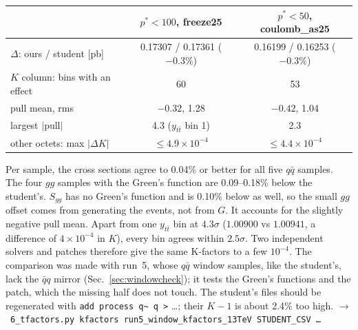 \documentclass[11pt]{article}
\newcommand{\code}[1]{\texttt{#1}}
\newcommand{\fn}[1]{\hfill$\to$~\code{#1}}
\begin{document}
\begin{center}\small
\begin{tabular}{@{}lcc@{}}
\toprule
 & $p^*<100$, freeze25 & $p^*<50$, coulomb\_as25\\
\midrule
$\Delta$: ours / student [pb] & 0.17307 / 0.17361 ($-0.3\%$) & 0.16199 / 0.16253 ($-0.3\%$)\\
$K$ column: bins with an effect & 60 & 53\\
\quad pull mean, rms & $-0.32$, 1.28 & $-0.42$, 1.04\\
\quad largest $|$pull$|$ & 4.3 ($y_{t\bar t}$ bin 1) & 2.3\\
other octets: max $|\Delta K|$ & $\le4.9\times10^{-4}$ & $\le4.4\times10^{-4}$\\
\bottomrule
\end{tabular}
\end{center}

Per sample, the cross sections agree to 0.04\% or better for all five $q\bar q$ samples. The four $gg$ samples with the Green's function
are 0.09--0.18\% below the student's. $S_{gg}$ has no Green's function and is 0.10\% below as well, so the small $gg$ offset comes from
generating the events, not from $G$. It accounts for the slightly negative pull mean. Apart from one $y_{t\bar t}$ bin at $4.3\sigma$
($1.00900$ vs $1.00941$, a difference of $4\times10^{-4}$ in $K$), every bin agrees within $2.5\sigma$. Two independent solvers and patches therefore give the
same K-factors to a few $10^{-4}$. The comparison was made with run~5, whose $q\bar q$ window samples, like the student's, lack the
$\bar qq$ mirror (Sec.~\ref{sec:windowcheck}); it tests the Green's functions and the patch, which the missing half does not touch.
The student's files should be regenerated with \code{add process q\~{} q >} \ldots; their $K-1$ is about 2.4\% too high.
\fn{6\_tfactors.py kfactors run5\_window\_kfactors\_13TeV STUDENT\_CSV \ldots}
\end{document}
